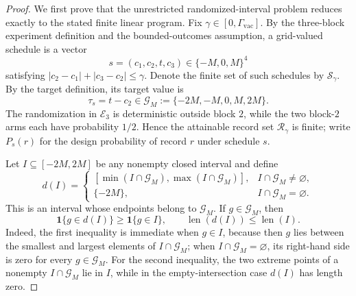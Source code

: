 \documentclass{article}
\begin{document}
\begin{proof}
We first prove that the unrestricted randomized-interval problem reduces exactly to the stated finite linear program.  Fix \(\gamma\in[0,\Gamma_{\mathrm{vac}}]\).  By the three-block experiment definition and the bounded-outcomes assumption, a grid-valued schedule is a vector
\[
s=(c_1,c_2,t,c_3)\in\{-M,0,M\}^{4}
\]
satisfying \(|c_2-c_1|+|c_3-c_2|\le\gamma\).  Denote the finite set of such schedules by \(\mathcal S_\gamma\).  By the target definition, its target value is
\[
\tau_s=t-c_2\in\mathcal G_M:=\{-2M,-M,0,M,2M\}.
\]
The randomization in \(\mathcal E_3\) is deterministic outside block \(2\), while the two block-\(2\) arms each have probability \(1/2\).  Hence the attainable record set \(\mathcal R_\gamma\) is finite; write \(P_s(r)\) for the design probability of record \(r\) under schedule \(s\).

Let \(I\subseteq[-2M,2M]\) be any nonempty closed interval and define
\[
d(I)=
\begin{cases}
[\min(I\cap\mathcal G_M),\max(I\cap\mathcal G_M)],&I\cap\mathcal G_M\ne\varnothing,\\
\{-2M\},&I\cap\mathcal G_M=\varnothing.
\end{cases}
\]
This is an interval whose endpoints belong to \(\mathcal G_M\).  If \(g\in\mathcal G_M\), then
\[
\mathbf 1\{g\in d(I)\}\ge \mathbf 1\{g\in I\},
\qquad
\operatorname{len}(d(I))\le \operatorname{len}(I).
\]
Indeed, the first inequality is immediate when \(g\in I\), because then \(g\) lies between the smallest and largest elements of \(I\cap\mathcal G_M\); when \(I\cap\mathcal G_M=\varnothing\), its right-hand side is zero for every \(g\in\mathcal G_M\).  For the second inequality, the two extreme points of a nonempty \(I\cap\mathcal G_M\) lie in \(I\), while in the empty-intersection case \(d(I)\) has length zero.


\end{proof}
\end{document}
